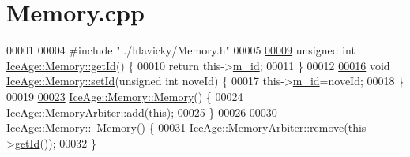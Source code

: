 \hypertarget{Memory_8cpp_source}{}\section{Memory.\+cpp}
\label{Memory_8cpp_source}

\begin{DoxyCode}
00001 
00004 \textcolor{preprocessor}{#include "../hlavicky/Memory.h"}
00005 
\hypertarget{Memory_8cpp_source.tex_l00009}{}\hyperlink{classIceAge_1_1Memory_ac8f0e51954a707e4653b7f8a1af5fac1}{00009} \textcolor{keywordtype}{unsigned} \textcolor{keywordtype}{int} \hyperlink{classIceAge_1_1Memory_ac8f0e51954a707e4653b7f8a1af5fac1}{IceAge::Memory::getId}() \{
00010     \textcolor{keywordflow}{return} this->\hyperlink{classIceAge_1_1Memory_a50782825cb2229e1a3dad9fbc7b0d0d8}{m\_id};
00011 \}
00012 
\hypertarget{Memory_8cpp_source.tex_l00016}{}\hyperlink{classIceAge_1_1Memory_aeea129a4caa3506bbfa5287a4f61fc90}{00016} \textcolor{keywordtype}{void} \hyperlink{classIceAge_1_1Memory_aeea129a4caa3506bbfa5287a4f61fc90}{IceAge::Memory::setId}(\textcolor{keywordtype}{unsigned} \textcolor{keywordtype}{int} noveId) \{
00017     this->\hyperlink{classIceAge_1_1Memory_a50782825cb2229e1a3dad9fbc7b0d0d8}{m\_id}=noveId;
00018 \}
00019 
\hypertarget{Memory_8cpp_source.tex_l00023}{}\hyperlink{classIceAge_1_1Memory_ae81d5a52a6b6d8f25e36689126b0d0c9}{00023} \hyperlink{classIceAge_1_1Memory_ae81d5a52a6b6d8f25e36689126b0d0c9}{IceAge::Memory::Memory}() \{
00024     \hyperlink{classIceAge_1_1MemoryArbiter_a219f22e94979f934a63a0fd28ef889f7}{IceAge::MemoryArbiter::add}(\textcolor{keyword}{this});
00025 \}
00026 
\hypertarget{Memory_8cpp_source.tex_l00030}{}\hyperlink{classIceAge_1_1Memory_ae2163982f0e32013f5b992c47752b5fd}{00030} \hyperlink{classIceAge_1_1Memory_ae2163982f0e32013f5b992c47752b5fd}{IceAge::Memory::~Memory}() \{
00031     \hyperlink{classIceAge_1_1MemoryArbiter_a15d44df0d0b3053548af55f5568f8792}{IceAge::MemoryArbiter::remove}(this->\hyperlink{classIceAge_1_1Memory_ac8f0e51954a707e4653b7f8a1af5fac1}{getId}());
00032 \}
\end{DoxyCode}

